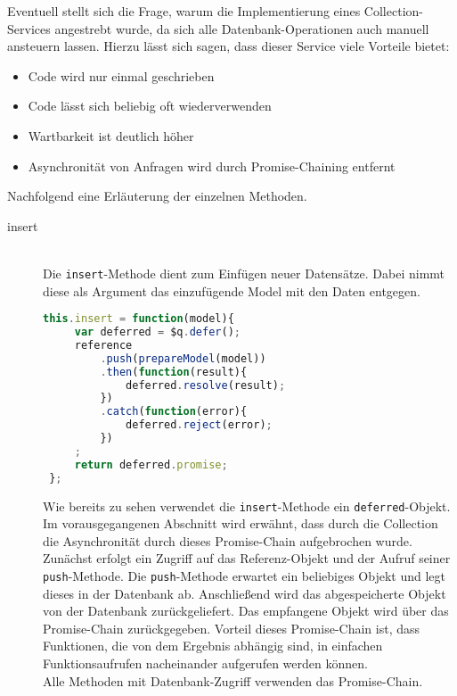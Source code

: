 Eventuell stellt sich die Frage, warum die Implementierung eines Collection-Services angestrebt wurde, da sich alle Datenbank-Operationen auch manuell ansteuern lassen. Hierzu lässt sich
sagen, dass dieser Service viele Vorteile bietet:
\begin{itemize}
\item{Code wird nur einmal geschrieben}
\item{Code lässt sich beliebig oft wiederverwenden}
\item{Wartbarkeit ist deutlich höher}
\item{Asynchronität von Anfragen wird durch Promise-Chaining entfernt}
\end{itemize}

Nachfolgend eine Erläuterung der einzelnen Methoden.

\begin{description}

\item[insert]\hfill \\
Die \texttt{insert}-Methode dient zum Einfügen neuer Datensätze. Dabei nimmt diese als Argument das einzufügende Model mit den Daten entgegen.
 \begin{lstlisting}[language=Javascript, label=code_CollectionInsert, caption=Insert-Methode einer Collection]
 this.insert = function(model){
     var deferred = $q.defer();
     reference
         .push(prepareModel(model))
         .then(function(result){
             deferred.resolve(result);
         })
         .catch(function(error){
             deferred.reject(error);
         })
     ;
     return deferred.promise;
 };
 \end{lstlisting}

 Wie bereits zu sehen verwendet die \texttt{insert}-Methode ein \texttt{deferred}-Objekt. Im vorausgegangenen Abschnitt wird erwähnt, dass durch die Collection die Asynchronität durch dieses Promise-Chain aufgebrochen wurde. Zunächst erfolgt ein Zugriff auf das Referenz-Objekt und der Aufruf seiner \texttt{push}-Methode. Die \texttt{push}-Methode erwartet ein beliebiges Objekt und legt dieses in der Datenbank ab. Anschließend wird das abgespeicherte Objekt von der Datenbank zurückgeliefert. Das empfangene Objekt wird über das Promise-Chain zurückgegeben.
 Vorteil dieses Promise-Chain ist, dass Funktionen, die von dem Ergebnis abhängig sind, in einfachen Funktionsaufrufen nacheinander aufgerufen werden können.\\
 Alle Methoden mit Datenbank-Zugriff verwenden das Promise-Chain.


\end{description}
